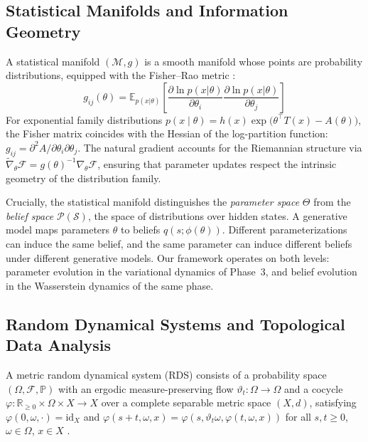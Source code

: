 \documentclass[11pt,a4paper]{article}
\theoremstyle{definition}
\newcommand{\R}{\mathbb{R}}
\newcommand{\E}{\mathbb{E}}
\newcommand{\VFE}{\mathcal{F}}
\newcommand{\cS}{\mathcal{S}}
\newcommand{\cM}{\mathcal{M}}
\newcommand{\cP}{\mathcal{P}}
\newcommand{\cF}{\mathcal{F}}  %
\begin{document}
\subsection{Statistical Manifolds and Information Geometry}
\label{sec:bg_ig}

A statistical manifold $(\cM, g)$ is a smooth manifold whose points are probability distributions, equipped with the Fisher--Rao metric \citep{amari2016information}:
\begin{equation}
  g_{ij}(\theta) = \E_{p(x|\theta)}\left[\frac{\partial \ln p(x|\theta)}{\partial \theta_i} \frac{\partial \ln p(x|\theta)}{\partial \theta_j}\right]
  \label{eq:fisher_rao}
\end{equation}
For exponential family distributions $p(x \mid \theta) = h(x) \exp\bigl(\theta^\top T(x) - A(\theta)\bigr)$, the Fisher matrix coincides with the Hessian of the log-partition function: $g_{ij} = \partial^2 A / \partial \theta_i \partial \theta_j$. The natural gradient \citep{amari1998natural} accounts for the Riemannian structure via $\tilde{\nabla}_\theta \VFE = g(\theta)^{-1} \nabla_\theta \VFE$, ensuring that parameter updates respect the intrinsic geometry of the distribution family.

Crucially, the statistical manifold distinguishes the \emph{parameter space} $\Theta$ from the \emph{belief space} $\cP(\cS)$, the space of distributions over hidden states. A generative model maps parameters $\theta$ to beliefs $q(s; \phi(\theta))$. Different parameterizations can induce the same belief, and the same parameter can induce different beliefs under different generative models. Our framework operates on both levels: parameter evolution in the variational dynamics of Phase~3, and belief evolution in the Wasserstein dynamics of the same phase.

\subsection{Random Dynamical Systems and Topological Data Analysis}
\label{sec:bg_rds}

A metric random dynamical system (RDS) consists of a probability space $(\Omega, \cF, \mathbb{P})$ with an ergodic measure-preserving flow $\vartheta_t: \Omega \to \Omega$ and a cocycle $\varphi: \R_{\geq 0} \times \Omega \times X \to X$ over a complete separable metric space $(X, d)$, satisfying $\varphi(0, \omega, \cdot) = \mathrm{id}_X$ and $\varphi(s+t, \omega, x) = \varphi(s, \vartheta_t \omega, \varphi(t, \omega, x))$ for all $s, t \geq 0$, $\omega \in \Omega$, $x \in X$ \citep{arnold1998random}.
\end{document}
